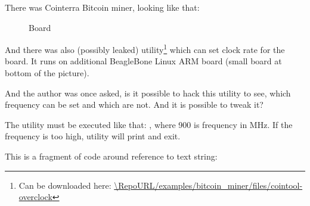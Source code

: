 
There was Cointerra Bitcoin miner, looking like that:

\begin{figure}[H]
\centering
{}
\caption{Board}
\end{figure}

And there was also (possibly leaked) utility\footnote{Can be downloaded here: \url{\RepoURL/examples/bitcoin_miner/files/cointool-overclock}}
which can set clock rate for the board.
It runs on additional BeagleBone Linux ARM board (small board at bottom of the picture).

And the author was once asked, is it possible to hack this utility to see, which frequency can be set and which are not.
And it is possible to tweak it?

The utility must be executed like that: , where 900 is frequency in MHz.
If the frequency is too high, utility will print  and exit.

This is a fragment of code around reference to  text string:

